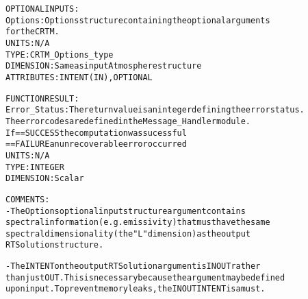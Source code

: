 \begin{alltt}
  OPTIONAL INPUTS:
        Options:        Options structure containing the optional arguments
                        for the CRTM.
                        UNITS:      N/A
                        TYPE:       CRTM_Options_type
                        DIMENSION:  Same as input Atmosphere structure
                        ATTRIBUTES: INTENT(IN), OPTIONAL
 
  FUNCTION RESULT:
        Error_Status:   The return value is an integer defining the error status.
                        The error codes are defined in the Message_Handler module.
                        If == SUCCESS the computation was sucessful
                           == FAILURE an unrecoverable error occurred
                        UNITS:      N/A
                        TYPE:       INTEGER
                        DIMENSION:  Scalar
 
  COMMENTS:
        - The Options optional input structure argument contains
          spectral information (e.g. emissivity) that must have the same
          spectral dimensionality (the "L" dimension) as the output
          RTSolution structure.
 
        - The INTENT on the output RTSolution argument is IN OUT rather
          than just OUT. This is necessary because the argument may be defined
          upon input. To prevent memory leaks, the IN OUT INTENT is a must.
 
  \end{alltt}
